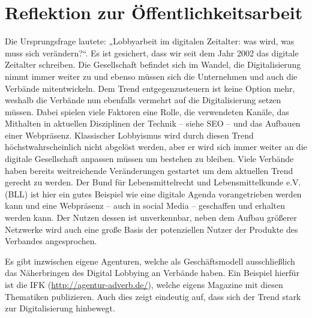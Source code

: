 \documentclass[12pt,a4paper,bibliography=totocnumbered,listof=totocnumbered]{scrartcl}
\begin{document}
\pagebreak

\section{Reflektion zur Öffentlichkeitsarbeit}

Die Ursprungsfrage lautete: „Lobbyarbeit im digitalen Zeitalter: was wird, was muss sich verändern?“. Es ist gesichert, dass wir seit dem Jahr 2002 das digitale Zeitalter schreiben. Die Gesellschaft befindet sich im Wandel, die Digitalisierung nimmt immer weiter zu und ebenso müssen sich die Unternehmen und auch die Verbände mitentwickeln. Dem Trend entgegenzusteuern ist keine Option mehr, weshalb die Verbände nun ebenfalls vermehrt auf die Digitalisierung setzen müssen. Dabei spielen viele Faktoren eine Rolle, die verwendeten Kanäle, das Mithalten in aktuellen Disziplinen der Technik – siehe SEO – und das Aufbauen einer Webpräsenz. Klassischer Lobbyismus wird durch diesen Trend höchstwahrscheinlich nicht abgelöst werden, aber er wird sich immer weiter      an die digitale Gesellschaft anpassen müssen um bestehen zu bleiben. 
Viele Verbände haben bereits weitreichende Veränderungen gestartet um dem aktuellen Trend gerecht zu werden. Der Bund für Lebensmittelrecht und Lebensmittelkunde e.V. (BLL) ist hier ein gutes Beispiel wie eine digitale Agenda vorangetrieben werden kann und eine Webpräsenz – auch in social Media – geschaffen und erhalten werden kann. Der Nutzen dessen ist unverkennbar, neben dem Aufbau größerer Netzwerke wird auch eine große Basis der potenziellen Nutzer der Produkte des Verbandes angesprochen.


Es gibt inzwischen eigene Agenturen, welche als Geschäftsmodell ausschließlich das Näherbringen des Digital Lobbying an Verbände haben. Ein Beispiel hierfür ist die IFK (\url{http://agentur-adverb.de/}), welche eigens Magazine mit diesen Thematiken publizieren. Auch dies zeigt eindeutig auf, dass sich der Trend stark zur Digitalisierung hinbewegt. 
\end{document}
